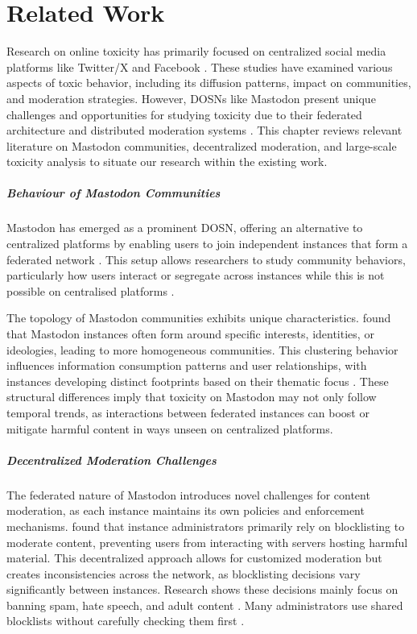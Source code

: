 \chapter{Related Work}

Research on online toxicity has primarily focused on centralized social media platforms like Twitter/X and Facebook \cite{fan:2022,nicholson:2023}. These studies have examined various aspects of toxic behavior, including its diffusion patterns, impact on communities, and moderation strategies. However, DOSNs like Mastodon present unique challenges and opportunities for studying toxicity due to their federated architecture and distributed moderation systems \cite{bono:2024}. This chapter reviews relevant literature on Mastodon communities, decentralized moderation, and large-scale toxicity analysis to situate our research within the existing work.

\paragraph{Behaviour of Mastodon Communities}
Mastodon has emerged as a prominent DOSN, offering an alternative to centralized platforms by enabling users to join independent instances that form a federated network \cite{zulli:2020}. This setup allows researchers to study community behaviors, particularly how users interact or segregate across instances while this is not possible on centralised platforms \cite{zignani:2018,zulli:2020}.

The topology of Mastodon communities exhibits unique characteristics. \citet{zulli:2020} found that Mastodon instances often form around specific interests, identities, or ideologies, leading to more homogeneous communities. This clustering behavior influences information consumption patterns and user relationships, with instances developing distinct footprints based on their thematic focus \cite{la_cava:2021}. These structural differences imply that toxicity on Mastodon may not only follow temporal trends, as interactions between federated instances can boost or mitigate harmful content in ways unseen on centralized platforms.

\paragraph{Decentralized Moderation Challenges}
The federated nature of Mastodon introduces novel challenges for content moderation, as each instance maintains its own policies and enforcement mechanisms. \citet{bono:2024} found that instance administrators primarily rely on blocklisting to moderate content, preventing users from interacting with servers hosting harmful material. This decentralized approach allows for customized moderation but creates inconsistencies across the network, as blocklisting decisions vary significantly between instances. Research shows these decisions mainly focus on banning spam, hate speech, and adult content \citep{nicholson:2023}. Many administrators use shared blocklists without carefully checking them first \cite{bono:2024}.

